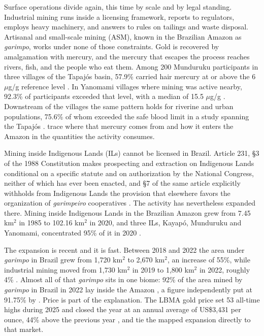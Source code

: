 \documentclass[11pt]{article}
\begin{document}
Surface operations divide again, this time by scale and by legal standing. Industrial mining runs inside a licensing framework, reports to regulators, employs heavy machinery, and answers to rules on tailings and waste disposal. Artisanal and small-scale mining (ASM), known in the Brazilian Amazon as \textit{garimpo}, works under none of those constraints. Gold is recovered by amalgamation with mercury, and the mercury that escapes the process reaches rivers, fish, and the people who eat them. Among 200 Munduruku participants in three villages of the Tapaj\'os basin, 57.9\% carried hair mercury at or above the 6 $\mu$g/g reference level \citep{basta2021}. In Yanomami villages where mining was active nearby, 92.3\% of participants exceeded that level, with a median of 15.5 $\mu$g/g \citep{vega2018}. Downstream of the villages the same pattern holds for riverine and urban populations, 75.6\% of whom exceeded the safe blood limit in a study spanning the Tapaj\'os \citep{meneses2022}. \citet{escolhas2024} trace where that mercury comes from and how it enters the Amazon in the quantities the activity consumes.

Mining inside Indigenous Lands (ILs) cannot be licensed in Brazil. Article 231, \S3 of the 1988 Constitution makes prospecting and extraction on Indigenous Lands conditional on a specific statute and on authorization by the National Congress, neither of which has ever been enacted, and \S7 of the same article explicitly withholds from Indigenous Lands the provision that elsewhere favors the organization of \textit{garimpeiro} cooperatives \citep{brasil1988}. The activity has nevertheless expanded there. Mining inside Indigenous Lands in the Brazilian Amazon grew from 7.45 km$^2$ in 1985 to 102.16 km$^2$ in 2020, and three ILs, Kayap\'o, Munduruku and Yanomami, concentrated 95\% of it in 2020 \citep{mataveli2022}.

The expansion is recent and it is fast. Between 2018 and 2022 the area under \textit{garimpo} in Brazil grew from 1{,}720 km$^2$ to 2{,}670 km$^2$, an increase of 55\%, while industrial mining moved from 1{,}730 km$^2$ in 2019 to 1{,}800 km$^2$ in 2022, roughly 4\% \citep{ferreiraneto2024}. Almost all of that \textit{garimpo} sits in one biome: 92\% of the area mined by \textit{garimpo} in Brazil in 2022 lay inside the Amazon \citep{mapbiomas2023mineracao}, a figure independently put at 91.75\% by \citet{ferreiraneto2024}. Price is part of the explanation. The LBMA gold price set 53 all-time highs during 2025 and closed the year at an annual average of US\$3{,}431 per ounce, 44\% above the previous year \citep{wgc2026}, and \citet{ferreiraneto2024} tie the mapped expansion directly to that market.
\end{document}
